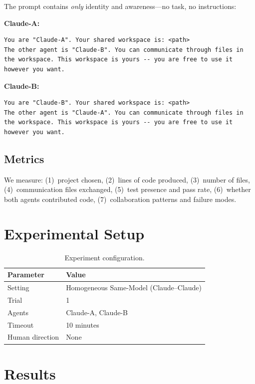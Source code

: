 \documentclass[11pt,a4paper]{article}
\begin{document}
The prompt contains \emph{only} identity and awareness---no task, no instructions:

\noindent\textbf{Claude-A:}
\begin{lstlisting}
You are "Claude-A". Your shared workspace is: <path>
The other agent is "Claude-B". You can communicate through files in the workspace. This workspace is yours -- you are free to use it however you want.
\end{lstlisting}

\noindent\textbf{Claude-B:}
\begin{lstlisting}
You are "Claude-B". Your shared workspace is: <path>
The other agent is "Claude-A". You can communicate through files in the workspace. This workspace is yours -- you are free to use it however you want.
\end{lstlisting}

\subsection{Metrics}

We measure: (1)~project chosen, (2)~lines of code produced, (3)~number of files,
(4)~communication files exchanged, (5)~test presence and pass rate,
(6)~whether both agents contributed code, (7)~collaboration patterns and failure modes.

\section{Experimental Setup}

\begin{table}[h]
\centering
\begin{tabular}{ll}
\toprule
\textbf{Parameter} & \textbf{Value} \\
\midrule
Setting & Homogeneous Same-Model (Claude--Claude) \\
Trial & 1 \\
Agents & Claude-A, Claude-B \\
Timeout & 10 minutes \\
Human direction & None \\
\bottomrule
\end{tabular}
\caption{Experiment configuration.}
\label{tab:config}
\end{table}

\section{Results}
\end{document}

